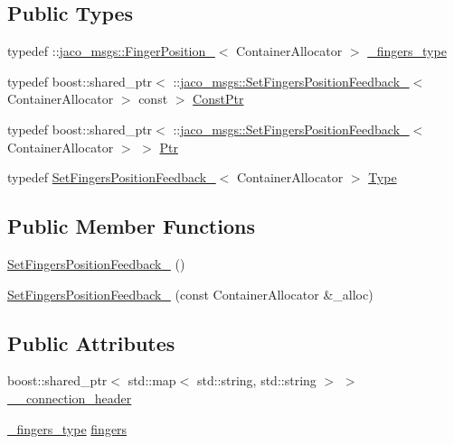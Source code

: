 \subsection*{Public Types}
\begin{DoxyCompactItemize}
\item 
typedef \+::\hyperlink{structjaco__msgs_1_1FingerPosition__}{jaco\+\_\+msgs\+::\+Finger\+Position\+\_\+}$<$ Container\+Allocator $>$ \hyperlink{structjaco__msgs_1_1SetFingersPositionFeedback___a462f832c5d1b5423986e6c7b2e4020d9}{\+\_\+fingers\+\_\+type}
\item 
typedef boost\+::shared\+\_\+ptr$<$ \+::\hyperlink{structjaco__msgs_1_1SetFingersPositionFeedback__}{jaco\+\_\+msgs\+::\+Set\+Fingers\+Position\+Feedback\+\_\+}$<$ Container\+Allocator $>$ const  $>$ \hyperlink{structjaco__msgs_1_1SetFingersPositionFeedback___a1039354c9981f48a820d5676ecda8d7c}{Const\+Ptr}
\item 
typedef boost\+::shared\+\_\+ptr$<$ \+::\hyperlink{structjaco__msgs_1_1SetFingersPositionFeedback__}{jaco\+\_\+msgs\+::\+Set\+Fingers\+Position\+Feedback\+\_\+}$<$ Container\+Allocator $>$ $>$ \hyperlink{structjaco__msgs_1_1SetFingersPositionFeedback___a826ac8c2d7e459ea36e0236507dc3175}{Ptr}
\item 
typedef \hyperlink{structjaco__msgs_1_1SetFingersPositionFeedback__}{Set\+Fingers\+Position\+Feedback\+\_\+}$<$ Container\+Allocator $>$ \hyperlink{structjaco__msgs_1_1SetFingersPositionFeedback___a8eb23d0c1ba0fe7aa712cc618d26294b}{Type}
\end{DoxyCompactItemize}
\subsection*{Public Member Functions}
\begin{DoxyCompactItemize}
\item 
\hyperlink{structjaco__msgs_1_1SetFingersPositionFeedback___ac46fe0d66d233746220ebc116be90136}{Set\+Fingers\+Position\+Feedback\+\_\+} ()
\item 
\hyperlink{structjaco__msgs_1_1SetFingersPositionFeedback___a0e27c705e739a7322991e4dd44e554d1}{Set\+Fingers\+Position\+Feedback\+\_\+} (const Container\+Allocator \&\+\_\+alloc)
\end{DoxyCompactItemize}
\subsection*{Public Attributes}
\begin{DoxyCompactItemize}
\item 
boost\+::shared\+\_\+ptr$<$ std\+::map$<$ std\+::string, std\+::string $>$ $>$ \hyperlink{structjaco__msgs_1_1SetFingersPositionFeedback___ad1d89c219a6e6858c48e30c83ae4a0db}{\+\_\+\+\_\+connection\+\_\+header}
\item 
\hyperlink{structjaco__msgs_1_1SetFingersPositionFeedback___a462f832c5d1b5423986e6c7b2e4020d9}{\+\_\+fingers\+\_\+type} \hyperlink{structjaco__msgs_1_1SetFingersPositionFeedback___ae2565d164d4f0daf1be357023e5d0be2}{fingers}
\end{DoxyCompactItemize}


